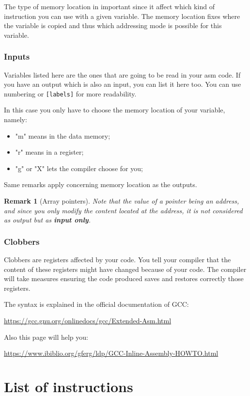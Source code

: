 \documentclass{article}
\newtheorem*{remark}{Remark}
\begin{document}
The type of memory location in important since it affect which kind of instruction you can use with a given
variable. The memory location fixes where the variable is copied and thus which addressing mode is possible
for this variable.

\subsubsection{Inputs} 
Variables listed here are the ones that are going to be read in your asm code.
If you have an output which is also an input, you can list it here too.
You can use numbering or \verb+[labels]+ for more readability.

In this case you only have to choose the memory location of your variable, namely:
\begin{itemize}
    \item "m" means in the data memory;
    \item "r" means in a register;
    \item "g" or "X" lets the compiler choose for you;
\end{itemize}
Same remarks apply concerning memory location as the outputs.

\begin{remark}[Array pointers]
Note that the value of a pointer being an address, and since you only modify 
the content located at the address, it is not considered as output but as \textbf{input only}.
\end{remark}


\subsubsection{Clobbers} 
Clobbers are registers affected by your code. You tell your compiler that the content of these
registers might have changed because of your code. The compiler will take measures ensuring the
code produced saves and restores correctly those registers.

The syntax is explained in the official documentation of GCC:

\url{https://gcc.gnu.org/onlinedocs/gcc/Extended-Asm.html}

Also this page will help you: 

\url{https://www.ibiblio.org/gferg/ldp/GCC-Inline-Assembly-HOWTO.html}

\section{List of instructions}
\end{document}
